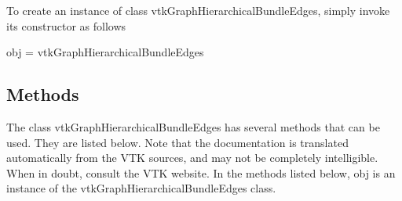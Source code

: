 To create an instance of class vtk\-Graph\-Hierarchical\-Bundle\-Edges, simply invoke its constructor as follows \begin{DoxyVerb}  obj = vtkGraphHierarchicalBundleEdges
\end{DoxyVerb}
 \hypertarget{vtkwidgets_vtkxyplotwidget_Methods}{}\subsection{Methods}\label{vtkwidgets_vtkxyplotwidget_Methods}
The class vtk\-Graph\-Hierarchical\-Bundle\-Edges has several methods that can be used. They are listed below. Note that the documentation is translated automatically from the V\-T\-K sources, and may not be completely intelligible. When in doubt, consult the V\-T\-K website. In the methods listed below, {\ttfamily obj} is an instance of the vtk\-Graph\-Hierarchical\-Bundle\-Edges class. 

